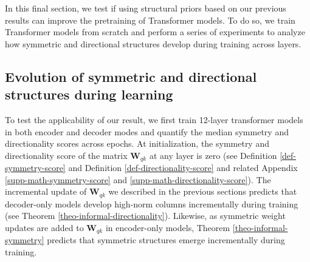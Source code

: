 In this final section, we test if using structural priors based on our previous results can improve the pretraining of Transformer models. 
%
To do so, we train Transformer models from scratch and perform a series of experiments to analyze how symmetric and directional structures develop during training across layers.
%





\subsection{Evolution of symmetric and directional structures during learning}
\label{sec-evolution-structures}
%

%
To test the applicability of our result, we first train 12-layer transformer models in both encoder and decoder modes and quantify the median symmetry and directionality scores across epochs.
%
At initialization, the symmetry and directionality score of the matrix $\bm{W}_{qk}$ at any layer is zero (see  Definition \ref{def-symmetry-score} and Definition \ref{def-directionality-score} and related Appendix  \ref{supp-math-symmetry-score} and \ref{supp-math-directionality-score}).
%
The incremental update of $\bm{W}_{qk}$ we described in the previous sections predicts that decoder-only models develop high-norm columns incrementally during training (see Theorem \ref{theo-informal-directionality}).
%
Likewise, as symmetric weight updates are added to $\bm{W}_{qk}$ in encoder-only models, Theorem \ref{theo-informal-symmetry} predicts that symmetric structures emerge incrementally during training.
%

%

